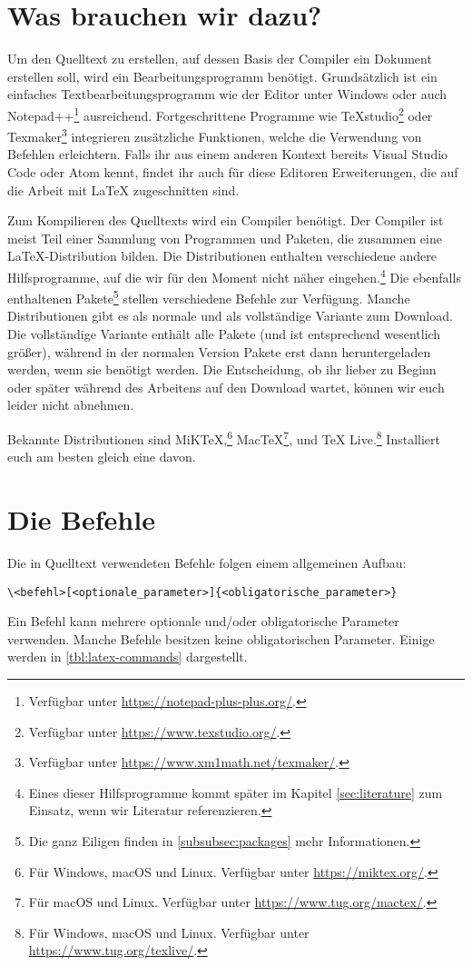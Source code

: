 \section{Was brauchen wir dazu?}
\label{subsec:what-we-need}
Um den Quelltext zu erstellen, auf dessen Basis der Compiler ein Dokument erstellen soll, wird ein Bearbeitungsprogramm benötigt.
Grundsätzlich ist ein einfaches Textbearbeitungsprogramm wie der Editor unter Windows oder auch Notepad++\footnote{Verfügbar unter \url{https://notepad-plus-plus.org/}.} ausreichend.
Fortgeschrittene Programme wie TeXstudio\footnote{Verfügbar unter \url{https://www.texstudio.org/}.} oder Texmaker\footnote{Verfügbar unter \url{https://www.xm1math.net/texmaker/}.} integrieren zusätzliche Funktionen, welche die Verwendung von Befehlen erleichtern.
Falls ihr aus einem anderen Kontext bereits Visual Studio Code oder Atom kennt, findet ihr auch für diese Editoren Erweiterungen, die auf die Arbeit mit \LaTeX{} zugeschnitten sind.

Zum Kompilieren des Quelltexts wird ein Compiler benötigt.
Der Compiler ist meist Teil einer Sammlung von Programmen und Paketen, die zusammen eine \LaTeX-Distribution bilden.
Die Distributionen enthalten verschiedene andere Hilfsprogramme, auf die wir für den Moment nicht näher eingehen.\footnote{Eines dieser Hilfsprogramme kommt später im Kapitel \ref{sec:literature} zum Einsatz, wenn wir Literatur referenzieren.}
Die ebenfalls enthaltenen Pakete\footnote{Die ganz Eiligen finden in \cref{subsubsec:packages} mehr Informationen.} stellen verschiedene Befehle zur Verfügung.
Manche Distributionen gibt es als normale und als vollständige Variante zum Download. 
Die vollständige Variante enthält alle Pakete (und ist entsprechend wesentlich größer), während in der normalen Version Pakete erst dann heruntergeladen werden, wenn sie benötigt werden.
Die Entscheidung, ob ihr lieber zu Beginn oder später während des Arbeitens auf den Download wartet, können wir euch leider nicht abnehmen.

Bekannte Distributionen sind MiK\TeX,\footnote{Für Windows, macOS und Linux. Verfügbar unter \url{https://miktex.org/}.} Mac\TeX\footnote{Für macOS und Linux. Verfügbar unter \url{https://www.tug.org/mactex/}.}, und \TeX{} Live.\footnote{Für Windows, macOS und Linux. Verfügbar unter \url{https://www.tug.org/texlive/}.}
Installiert euch am besten gleich eine davon.

\section{Die Befehle}
\label{subsec:command-structure}
Die in Quelltext verwendeten Befehle folgen einem allgemeinen Aufbau:
\begin{verbatim}
\<befehl>[<optionale_parameter>]{<obligatorische_parameter>}
\end{verbatim}
Ein Befehl kann mehrere optionale und/oder obligatorische Parameter verwenden. Manche Befehle besitzen keine obligatorischen Parameter. Einige werden in \cref{tbl:latex-commands} dargestellt.

